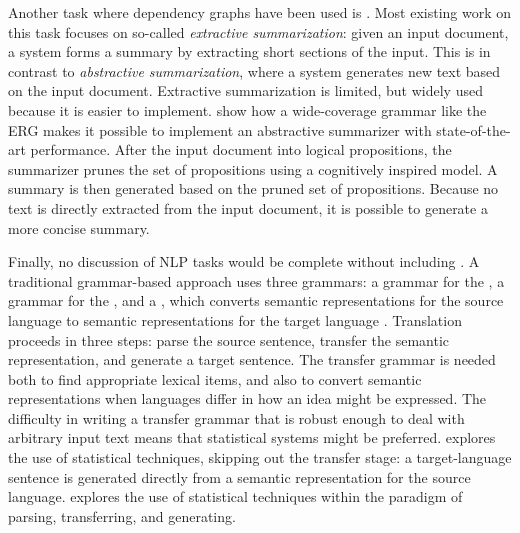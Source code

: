 \documentclass[output=paper,nonflat]{langsci/langscibook}
\begin{document}
Another task where dependency graphs have been used is \textit{}.
Most existing work on this task focuses on so-called \textit{extractive summarization}:
given an input document, a system forms a summary by extracting short sections of the input.
This is in contrast to \textit{abstractive summarization},
where a system generates new text based on the input document.
Extractive summarization is limited, but widely used because it is easier to implement.
\citet{fang2016summarise} show how a wide-coverage grammar like the ERG
makes it possible to implement an abstractive summarizer with state-of-the-art performance.
After  the input document into logical propositions,
the summarizer prunes the set of propositions using a cognitively inspired model.
A summary is then generated based on the pruned set of propositions.
Because no text is directly extracted from the input document,
it is possible to generate a more concise summary.

Finally, no discussion of NLP tasks would be complete without including \textit{}.
A traditional grammar-based approach uses three grammars:
a grammar for the ,
a grammar for the ,
and a \textit{}, which converts semantic representations for the source language
to semantic representations for the target language \citep{OVL2007a-u,bond2011deep}.
Translation proceeds in three steps:
parse the source sentence, transfer the semantic representation, and generate a target sentence.
The transfer grammar is needed both to find appropriate lexical items,
and also to convert semantic representations
when languages differ in how an idea might be expressed.
The difficulty in writing a transfer grammar
that is robust enough to deal with arbitrary input text
means that statistical systems might be preferred.
\citet{horvat2017translate} explores the use of statistical techniques,
skipping out the transfer stage:
a target-language sentence is generated directly
from a semantic representation for the source language.
\citet{goodman2018translate} explores the use of statistical techniques
within the paradigm of parsing, transferring, and generating.

\end{document}
